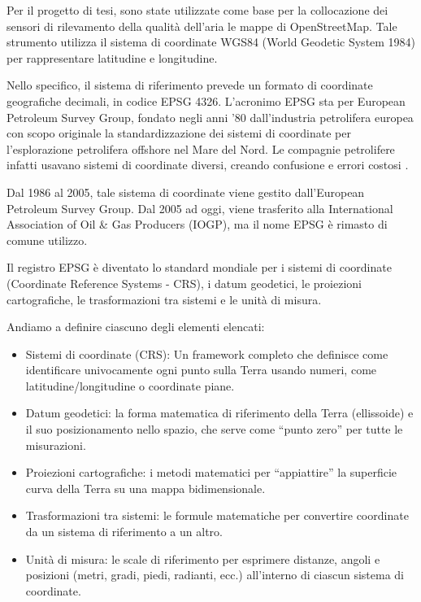 Per il progetto di tesi, sono state utilizzate come base per la collocazione dei sensori di rilevamento della qualità dell'aria le mappe di OpenStreetMap. Tale strumento utilizza il sistema di coordinate WGS84 (World Geodetic System 1984) per rappresentare latitudine e longitudine.

Nello specifico, il sistema di riferimento prevede un formato di coordinate geografiche decimali, in codice EPSG 4326. L'acronimo EPSG sta per European Petroleum Survey Group, fondato negli anni '80 dall'industria petrolifera europea con scopo originale la standardizzazione dei sistemi di coordinate per l'esplorazione petrolifera offshore nel Mare del Nord. Le compagnie petrolifere infatti usavano sistemi di coordinate diversi, creando confusione e errori costosi \cite{iogp2019, ashkenazi1984}.

Dal 1986 al 2005, tale sistema di coordinate viene gestito dall'European Petroleum Survey Group. Dal 2005 ad oggi, viene trasferito alla International Association of Oil \& Gas Producers (IOGP), ma il nome EPSG è rimasto di comune utilizzo.

Il registro EPSG è diventato lo standard mondiale per i sistemi di coordinate (Coordinate Reference Systems - CRS), i datum geodetici, le proiezioni cartografiche, le trasformazioni tra sistemi e le unità di misura.

Andiamo a definire ciascuno degli elementi elencati:

\begin{itemize}
\item Sistemi di coordinate (CRS): Un framework completo che definisce come identificare univocamente ogni punto sulla Terra usando numeri, come latitudine/longitudine o coordinate piane.
\item Datum geodetici: la forma matematica di riferimento della Terra (ellissoide) e il suo posizionamento nello spazio, che serve come ``punto zero'' per tutte le misurazioni.
\item Proiezioni cartografiche: i metodi matematici per ``appiattire'' la superficie curva della Terra su una mappa bidimensionale.
\item Trasformazioni tra sistemi: le formule matematiche per convertire coordinate da un sistema di riferimento a un altro.
\item Unità di misura: le scale di riferimento per esprimere distanze, angoli e posizioni (metri, gradi, piedi, radianti, ecc.) all'interno di ciascun sistema di coordinate.
\end{itemize}

